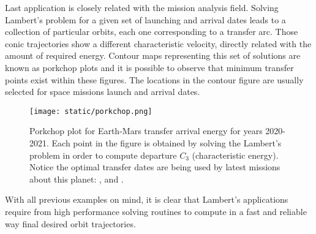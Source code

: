 Last application is closely related with the mission analysis field. Solving
Lambert's problem for a given set of launching and arrival dates leads to a
collection of particular orbits, each one corresponding to a transfer arc.
Those conic trajectories show a different characteristic velocity, directly
related with the amount of required energy.  Contour maps representing this set
of solutions are known as porkchop plots and it is possible to observe that minimum
transfer points exist within these figures. The locations in the contour
figure are usually selected for space missions launch and arrival dates.

\begin{figure}[h]
  \centering
  \texttt{[image: static/porkchop.png]}
  \caption[Porkchop plot for Earth-Mars for years 2020-2021]{Porkchop plot for Earth-Mars transfer arrival energy for years 2020-2021.
    Each point in the figure is obtained by solving the Lambert's problem in order
    to compute departure $C_{3}$ (characteristic energy). Notice the optimal
    transfer dates are being used by latest missions about this planet:
    \cite{perseverance2020}, \cite{tianwen1} and \cite{hope2021}.}
  \label{fig:porkchop_perseverance}
\end{figure}

With all previous examples on mind, it is clear that Lambert's applications
require from high performance solving routines to compute in a fast and reliable
way final desired orbit trajectories.
